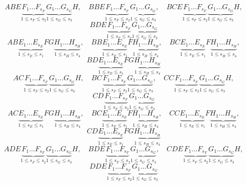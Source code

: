 \documentclass[12pt,a4paper,oneside,fleqn,leqno]{article}
\theoremstyle{definition}
\begin{document}
		$$
			ABE\underbrace{F_1\ldots F_{s_F}}_{1\leqslant s_F \leqslant s_2}\underbrace{G_1\ldots G_{s_G}}_{1\leqslant s_G \leqslant s_3}H,\quad BBE\underbrace{F_1\ldots F_{s_F}}_{1\leqslant s_F \leqslant s_2}\underbrace{G_1\ldots G_{s_G}}_{1\leqslant s_G \leqslant s_3},\quad BCE\underbrace{F_1\ldots F_{s_F}}_{1\leqslant s_F \leqslant s_2}\underbrace{G_1\ldots G_{s_G}}_{1\leqslant s_G \leqslant s_3}H,$$ $$ BDE\underbrace{F_1\ldots F_{s_F}}_{1\leqslant s_F \leqslant s_2}\underbrace{G_1\ldots G_{s_G}}_{1\leqslant s_G \leqslant s_3}
		$$
		$$
			AB\underbrace{E_1\ldots E_{s_E}}_{1\leqslant s_E \leqslant s_1}FG\underbrace{H_1\ldots H_{s_H}}_{1\leqslant s_H \leqslant s_4},\quad BB\underbrace{E_1\ldots E_{s_E}}_{1\leqslant s_E \leqslant s_1}F\underbrace{H_1\ldots H_{s_H}}_{1\leqslant s_H \leqslant s_4}, \quad BC\underbrace{E_1\ldots E_{s_E}}_{1\leqslant s_E \leqslant s_1}F\underbrace{H_1\ldots H_{s_H}}_{1\leqslant s_H \leqslant s_4},$$ $$ BD\underbrace{E_1\ldots E_{s_E}}_{1\leqslant s_E \leqslant s_1}FG\underbrace{H_1\ldots H_{s_H}}_{1\leqslant s_H \leqslant s_4}
		$$
		$$
			AC\underbrace{F_1\ldots F_{s_F}}_{1\leqslant s_F \leqslant s_2}\underbrace{G_1\ldots G_{s_G}}_{1\leqslant s_G \leqslant s_3}H,\quad BC\underbrace{F_1\ldots F_{s_F}}_{1\leqslant s_F \leqslant s_2}\underbrace{G_1\ldots G_{s_G}}_{1\leqslant s_G \leqslant s_3}, \quad CC\underbrace{F_1\ldots F_{s_F}}_{1\leqslant s_F \leqslant s_2}\underbrace{G_1\ldots G_{s_G}}_{1\leqslant s_G \leqslant s_3}H,$$ $$ CD\underbrace{F_1\ldots F_{s_F}}_{1\leqslant s_F \leqslant s_2}\underbrace{G_1\ldots G_{s_G}}_{1\leqslant s_G \leqslant s_3}
		$$
		$$
			AC\underbrace{E_1\ldots E_{s_E}}_{1\leqslant s_E \leqslant s_1}FG\underbrace{H_1\ldots H_{s_H}}_{1\leqslant s_H \leqslant s_4},\quad BC\underbrace{E_1\ldots E_{s_E}}_{1\leqslant s_E \leqslant s_1}F\underbrace{H_1\ldots H_{s_H}}_{1\leqslant s_H \leqslant s_4},\quad CC\underbrace{E_1\ldots E_{s_E}}_{1\leqslant s_E \leqslant s_1}F\underbrace{H_1\ldots H_{s_H}}_{1\leqslant s_H \leqslant s_4}, $$ $$CD\underbrace{E_1\ldots E_{s_E}}_{1\leqslant s_E \leqslant s_1}FG\underbrace{H_1\ldots H_{s_H}}_{1\leqslant s_H \leqslant s_4}
		$$
		$$
			ADE\underbrace{F_1\ldots F_{s_F}}_{1\leqslant s_F \leqslant s_2}\underbrace{G_1\ldots G_{s_G}}_{1\leqslant s_G \leqslant s_3}H,\quad BDE\underbrace{F_1\ldots F_{s_F}}_{1\leqslant s_F \leqslant s_2}\underbrace{G_1\ldots G_{s_G}}_{1\leqslant s_G \leqslant s_3},\quad CDE\underbrace{F_1\ldots F_{s_F}}_{1\leqslant s_F \leqslant s_2}\underbrace{G_1\ldots G_{s_G}}_{1\leqslant s_G \leqslant s_3}H, $$ $$DDE\underbrace{F_1\ldots F_{s_F}}_{1\leqslant s_F \leqslant s_2}\underbrace{G_1\ldots G_{s_G}}_{1\leqslant s_G \leqslant s_3}
		$$
\end{document}
